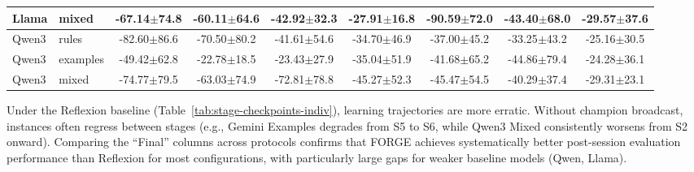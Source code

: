 \documentclass[sigconf]{acmart}
\begin{document}
\begin{table}[htbp]
\begin{tabular}{llccccccc}
Llama & mixed & -67.14$\pm$74.8 & -60.11$\pm$64.6 & -42.92$\pm$32.3 & -27.91$\pm$16.8 & -90.59$\pm$72.0 & -43.40$\pm$68.0 & -29.57$\pm$37.6 \\
\midrule
Qwen3 & rules & -82.60$\pm$86.6 & -70.50$\pm$80.2 & -41.61$\pm$54.6 & -34.70$\pm$46.9 & -37.00$\pm$45.2 & -33.25$\pm$43.2 & -25.16$\pm$30.5 \\
Qwen3 & examples & -49.42$\pm$62.8 & -22.78$\pm$18.5 & -23.43$\pm$27.9 & -35.04$\pm$51.9 & -41.68$\pm$65.2 & -44.86$\pm$79.4 & -24.28$\pm$36.1 \\
Qwen3 & mixed & -74.77$\pm$79.5 & -63.03$\pm$74.9 & -72.81$\pm$78.8 & -45.27$\pm$52.3 & -45.47$\pm$54.5 & -40.29$\pm$37.4 & -29.31$\pm$23.1 \\
\bottomrule
\end{tabular}
\end{table}

Under the Reflexion baseline (Table~\ref{tab:stage-checkpoints-indiv}), learning trajectories are more erratic. Without champion broadcast, instances often regress between stages (e.g., Gemini Examples degrades from S5 to S6, while Qwen3 Mixed consistently worsens from S2 onward). Comparing the ``Final'' columns across protocols confirms that FORGE achieves systematically better post-session evaluation performance than Reflexion for most configurations, with particularly large gaps for weaker baseline models (Qwen, Llama).
\end{document}
